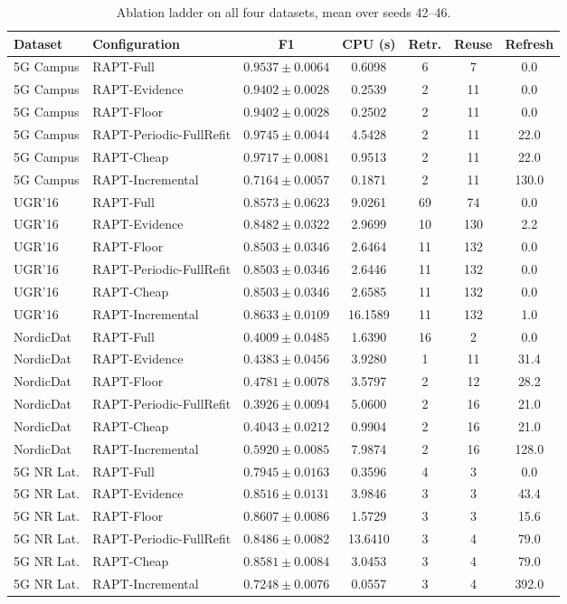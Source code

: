 \begin{table}[t]
\caption{Ablation ladder on all four datasets, mean over seeds 42--46.}
\label{tab:ablation}
\centering
\scriptsize
\begin{tabular}{@{}llccccc@{}}
\toprule
\textbf{Dataset} & \textbf{Configuration} & \textbf{F1} & \textbf{CPU (s)} & \textbf{Retr.} & \textbf{Reuse} & \textbf{Refresh} \\
\midrule
5G Campus & RAPT-Full & $0.9537 \pm 0.0064$ & 0.6098 & 6 & 7 & 0.0 \\
5G Campus & RAPT-Evidence & $0.9402 \pm 0.0028$ & 0.2539 & 2 & 11 & 0.0 \\
5G Campus & RAPT-Floor & $0.9402 \pm 0.0028$ & 0.2502 & 2 & 11 & 0.0 \\
5G Campus & RAPT-Periodic-FullRefit & $0.9745 \pm 0.0044$ & 4.5428 & 2 & 11 & 22.0 \\
5G Campus & RAPT-Cheap & $0.9717 \pm 0.0081$ & 0.9513 & 2 & 11 & 22.0 \\
5G Campus & RAPT-Incremental & $0.7164 \pm 0.0057$ & 0.1871 & 2 & 11 & 130.0 \\
UGR'16 & RAPT-Full & $0.8573 \pm 0.0623$ & 9.0261 & 69 & 74 & 0.0 \\
UGR'16 & RAPT-Evidence & $0.8482 \pm 0.0322$ & 2.9699 & 10 & 130 & 2.2 \\
UGR'16 & RAPT-Floor & $0.8503 \pm 0.0346$ & 2.6464 & 11 & 132 & 0.0 \\
UGR'16 & RAPT-Periodic-FullRefit & $0.8503 \pm 0.0346$ & 2.6446 & 11 & 132 & 0.0 \\
UGR'16 & RAPT-Cheap & $0.8503 \pm 0.0346$ & 2.6585 & 11 & 132 & 0.0 \\
UGR'16 & RAPT-Incremental & $0.8633 \pm 0.0109$ & 16.1589 & 11 & 132 & 1.0 \\
NordicDat & RAPT-Full & $0.4009 \pm 0.0485$ & 1.6390 & 16 & 2 & 0.0 \\
NordicDat & RAPT-Evidence & $0.4383 \pm 0.0456$ & 3.9280 & 1 & 11 & 31.4 \\
NordicDat & RAPT-Floor & $0.4781 \pm 0.0078$ & 3.5797 & 2 & 12 & 28.2 \\
NordicDat & RAPT-Periodic-FullRefit & $0.3926 \pm 0.0094$ & 5.0600 & 2 & 16 & 21.0 \\
NordicDat & RAPT-Cheap & $0.4043 \pm 0.0212$ & 0.9904 & 2 & 16 & 21.0 \\
NordicDat & RAPT-Incremental & $0.5920 \pm 0.0085$ & 7.9874 & 2 & 16 & 128.0 \\
5G NR Lat. & RAPT-Full & $0.7945 \pm 0.0163$ & 0.3596 & 4 & 3 & 0.0 \\
5G NR Lat. & RAPT-Evidence & $0.8516 \pm 0.0131$ & 3.9846 & 3 & 3 & 43.4 \\
5G NR Lat. & RAPT-Floor & $0.8607 \pm 0.0086$ & 1.5729 & 3 & 3 & 15.6 \\
5G NR Lat. & RAPT-Periodic-FullRefit & $0.8486 \pm 0.0082$ & 13.6410 & 3 & 4 & 79.0 \\
5G NR Lat. & RAPT-Cheap & $0.8581 \pm 0.0084$ & 3.0453 & 3 & 4 & 79.0 \\
5G NR Lat. & RAPT-Incremental & $0.7248 \pm 0.0076$ & 0.0557 & 3 & 4 & 392.0 \\
\bottomrule
\end{tabular}
\end{table}
